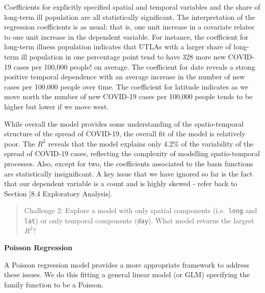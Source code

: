 \documentclass[
]{book}
\newenvironment{Shaded}{\begin{snugshade}}{\end{snugshade}}
\newcommand{\CommentTok}[1]{\textcolor[rgb]{0.56,0.35,0.01}{\textit{#1}}}
\newcommand{\DataTypeTok}[1]{\textcolor[rgb]{0.13,0.29,0.53}{#1}}
\newcommand{\KeywordTok}[1]{\textcolor[rgb]{0.13,0.29,0.53}{\textbf{#1}}}
\newcommand{\NormalTok}[1]{#1}
\newcommand{\OperatorTok}[1]{\textcolor[rgb]{0.81,0.36,0.00}{\textbf{#1}}}
\newcommand{\StringTok}[1]{\textcolor[rgb]{0.31,0.60,0.02}{#1}}
\begin{document}
Coefficients for explicitly specified spatial and temporal variables and the share of long-term ill population are all statistically significant. The interpretation of the regression coefficients is as usual; that is, one unit increase in a covariate relates to one unit increase in the dependent variable. For instance, the coefficient for long-term illness population indicates that UTLAs with a larger share of long-term ill population in one percentage point tend to have 328 more new COVID-19 cases per 100,000 people! on average. The coefficient for date reveals a strong positive temporal dependence with an average increase in the number of new cases per 100,000 people over time. The coefficient for latitude indicates as we move north the number of new COVID-19 cases per 100,000 people tends to be higher but lower if we move west.

While overall the model provides some understanding of the spatio-temporal structure of the spread of COVID-19, the overall fit of the model is relatively poor. The \(R^{2}\) reveals that the model explains only 4.2\% of the variability of the spread of COVID-19 cases, reflecting the complexity of modelling spatio-temporal processes. Also, except for two, the coefficients associated to the basis functions are statistically insignificant. A key issue that we have ignored so far is the fact that our dependent variable is a count and is highly skewed - refer back to Section {[}8.4 Exploratory Analysis{]}.

\begin{quote}
Challenge 2: Explore a model with only spatial components (i.e.~\texttt{long} and \texttt{lat}) or only temporal components (\texttt{day}). What model returns the largest \(R^{2}\)?
\end{quote}

\textbf{Poisson Regression}

A Poisson regression model provides a more appropriate framework to address these issues. We do this fitting a general linear model (or GLM) specifying the family function to be a Poisson.

\begin{Shaded}
\end{Shaded}
\end{document}
